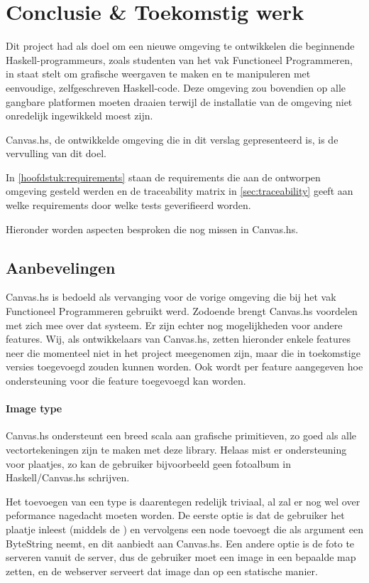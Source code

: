\chapter{Conclusie \& Toekomstig werk} \label{hoofdstuk:conclusie}
Dit project had als doel om een nieuwe omgeving te ontwikkelen die beginnende Haskell-programmeurs, zoals studenten van het vak Functioneel Programmeren, in staat stelt om grafische weergaven te maken en te manipuleren met eenvoudige, zelfgeschreven Haskell-code. Deze omgeving zou bovendien op alle gangbare platformen moeten draaien terwijl de installatie van de omgeving niet onredelijk ingewikkeld moest zijn.

Canvas.hs, de ontwikkelde omgeving die in dit verslag gepresenteerd is, is de vervulling van dit doel. 

In \autoref{hoofdstuk:requirements} staan de requirements die aan de ontworpen omgeving gesteld werden en de traceability matrix in \autoref{sec:traceability} geeft aan welke requirements door welke tests geverifieerd worden.


Hieronder worden aspecten besproken die nog missen in Canvas.hs. 

\section{Aanbevelingen}
Canvas.hs is bedoeld als vervanging voor de vorige omgeving die bij het vak Functioneel Programmeren gebruikt werd. Zodoende brengt Canvas.hs voordelen met zich mee over dat systeem. Er zijn echter nog mogelijkheden voor andere features. Wij, als ontwikkelaars van Canvas.hs, zetten hieronder enkele features neer die momenteel niet in het project meegenomen zijn, maar die in toekomstige versies toegevoegd zouden kunnen worden. Ook wordt per feature aangegeven hoe ondersteuning voor die feature toegevoegd kan worden.

\subsubsection{Image type}
Canvas.hs ondersteunt een breed scala aan grafische primitieven, zo goed als alle vectortekeningen zijn te maken met deze library. Helaas mist er ondersteuning voor plaatjes, zo kan de gebruiker bijvoorbeeld geen fotoalbum in Haskell/Canvas.hs schrijven.

Het toevoegen van een  type is daarentegen redelijk triviaal, al zal er nog wel over peformance nagedacht moeten worden. De eerste optie is dat de gebruiker het plaatje inleest (middels de ) en vervolgens een  node toevoegt die als argument een ByteString neemt, en dit aanbiedt aan Canvas.hs. Een andere optie is de foto te serveren vanuit de server, dus de gebruiker moet een image in een bepaalde map zetten, en de webserver serveert dat image dan op een statische manier.


